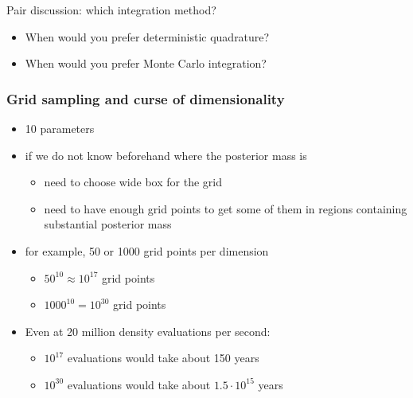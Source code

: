 \documentclass[10pt]{beamer}
\begin{document}
\begin{frame}{Pair discussion: which integration method?}

  \begin{itemize}
  \item When would you prefer deterministic quadrature?
  \item When would you prefer Monte Carlo integration?
  \end{itemize}


\end{frame}

\begin{frame}
\frametitle{Grid sampling and curse of dimensionality}

  \begin{itemize}
      \item 10 parameters
      \item if we do not know beforehand where the posterior mass is
        \begin{itemize}
          \item need to choose wide box for the grid
          \item need to have enough grid points to get some of them
            in regions containing substantial posterior mass
        \end{itemize}
      \item for example, 50 or 1000 grid points per dimension
        \begin{itemize}
        \item[$\rightarrow$] $50^{10} \approx 10^{17}$ grid points
        \item[$\rightarrow$] $1000^{10} = 10^{30}$ grid points
        \end{itemize}
      \pause
      \item Even at 20 million density evaluations per second:
        \begin{itemize}
        \item[$\rightarrow$] $10^{17}$ evaluations would take about 150 years
        \item[$\rightarrow$] $10^{30}$ evaluations would take about
          $1.5\cdot 10^{15}$ years
        \end{itemize}
 \end{itemize}

\end{frame}
\end{document}

